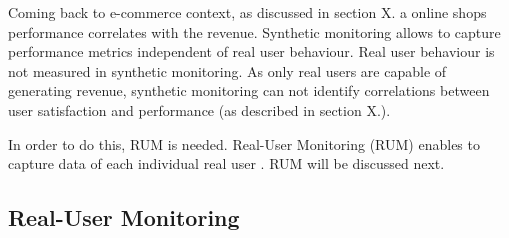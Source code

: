 
Coming back to e-commerce context, as discussed in section X.  a online shops performance correlates with the revenue.
Synthetic monitoring allows to capture performance metrics independent of real user behaviour.
Real user behaviour is not measured in synthetic monitoring.
As only real users are capable of generating revenue, synthetic monitoring can not identify correlations between user satisfaction and performance (as described in section X.).%

In order to do this, RUM is needed.
Real-User Monitoring (RUM) enables to capture data of each individual real user .
RUM will be discussed next.
















\subsection{Real-User Monitoring}



